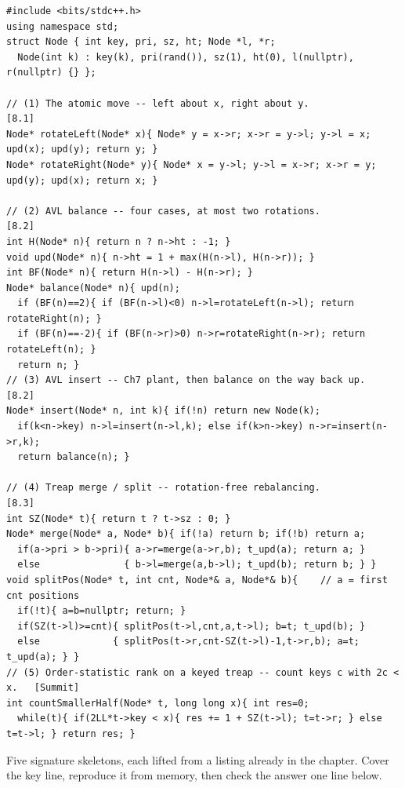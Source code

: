 \begin{lstlisting}[caption={Chapter 8 code kit: the rotation, AVL balance and insert, treap merge and split, an implicit split, and an order-statistic rank}, label={lst:c06-kit}]
#include <bits/stdc++.h>
using namespace std;
struct Node { int key, pri, sz, ht; Node *l, *r;
  Node(int k) : key(k), pri(rand()), sz(1), ht(0), l(nullptr), r(nullptr) {} };

// (1) The atomic move -- left about x, right about y.                      [8.1]
Node* rotateLeft(Node* x){ Node* y = x->r; x->r = y->l; y->l = x; upd(x); upd(y); return y; }
Node* rotateRight(Node* y){ Node* x = y->l; y->l = x->r; x->r = y; upd(y); upd(x); return x; }

// (2) AVL balance -- four cases, at most two rotations.                    [8.2]
int H(Node* n){ return n ? n->ht : -1; }
void upd(Node* n){ n->ht = 1 + max(H(n->l), H(n->r)); }
int BF(Node* n){ return H(n->l) - H(n->r); }
Node* balance(Node* n){ upd(n);
  if (BF(n)==2){ if (BF(n->l)<0) n->l=rotateLeft(n->l); return rotateRight(n); }
  if (BF(n)==-2){ if (BF(n->r)>0) n->r=rotateRight(n->r); return rotateLeft(n); }
  return n; }
// (3) AVL insert -- Ch7 plant, then balance on the way back up.            [8.2]
Node* insert(Node* n, int k){ if(!n) return new Node(k);
  if(k<n->key) n->l=insert(n->l,k); else if(k>n->key) n->r=insert(n->r,k);
  return balance(n); }

// (4) Treap merge / split -- rotation-free rebalancing.                    [8.3]
int SZ(Node* t){ return t ? t->sz : 0; }
Node* merge(Node* a, Node* b){ if(!a) return b; if(!b) return a;
  if(a->pri > b->pri){ a->r=merge(a->r,b); t_upd(a); return a; }
  else               { b->l=merge(a,b->l); t_upd(b); return b; } }
void splitPos(Node* t, int cnt, Node*& a, Node*& b){    // a = first cnt positions
  if(!t){ a=b=nullptr; return; }
  if(SZ(t->l)>=cnt){ splitPos(t->l,cnt,a,t->l); b=t; t_upd(b); }
  else             { splitPos(t->r,cnt-SZ(t->l)-1,t->r,b); a=t; t_upd(a); } }
// (5) Order-statistic rank on a keyed treap -- count keys c with 2c < x.   [Summit]
int countSmallerHalf(Node* t, long long x){ int res=0;
  while(t){ if(2LL*t->key < x){ res += 1 + SZ(t->l); t=t->r; } else t=t->l; } return res; }
\end{lstlisting}


Five signature skeletons, each lifted from a listing already in the chapter. Cover the key line,
reproduce it from memory, then check the answer one line below.

